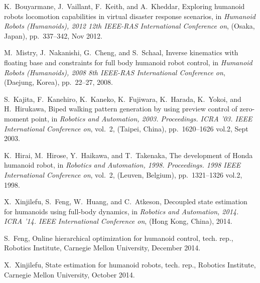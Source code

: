 \documentclass{ws-ijhr}
\begin{document}
\begin{thebibliography}{10}
K.~Bouyarmane, J.~Vaillant, F.~Keith, and A.~Kheddar, Exploring humanoid
  robots locomotion capabilities in virtual disaster response scenarios, in
  {\em Humanoid Robots (Humanoids), 2012 12th IEEE-RAS International Conference
  on}, (Osaka, Japan), pp.~337--342, Nov 2012.

M.~Mistry, J.~Nakanishi, G.~Cheng, and S.~Schaal, Inverse kinematics with
  floating base and constraints for full body humanoid robot control, in {\em
  Humanoid Robots (Humanoids), 2008 8th IEEE-RAS International Conference on},
  (Daejung, Korea), pp.~22--27, 2008.

S.~Kajita, F.~Kanehiro, K.~Kaneko, K.~Fujiwara, K.~Harada, K.~Yokoi, and
  H.~Hirukawa, Biped walking pattern generation by using preview control of
  zero-moment point, in {\em Robotics and Automation, 2003. Proceedings. ICRA
  '03. IEEE International Conference on}, vol.~2, (Taipei, China),
  pp.~1620--1626 vol.2, Sept 2003.

K.~Hirai, M.~Hirose, Y.~Haikawa, and T.~Takenaka, The development of {Honda}
  humanoid robot, in {\em Robotics and Automation, 1998. Proceedings. 1998
  IEEE International Conference on}, vol.~2, (Leuven, Belgium), pp.~1321--1326
  vol.2, 1998.

X.~Xinjilefu, S.~Feng, W.~Huang, and C.~Atkeson, Decoupled state estimation
  for humanoids using full-body dynamics, in {\em Robotics and Automation,
  2014. ICRA '14. IEEE International Conference on}, (Hong Kong, China), 2014.

S.~Feng, Online hierarchical optimization for humanoid control, tech. rep.,
  Robotics Institute, Carnegie Mellon University, December 2014.

X.~Xinjilefu, State estimation for humanoid robots, tech. rep., Robotics
  Institute, Carnegie Mellon University, October 2014.

\end{thebibliography}


%
\end{document}

